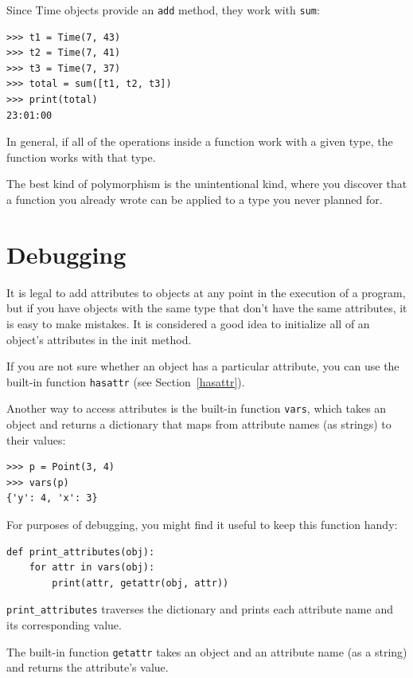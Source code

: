 \documentclass[10pt]{book}
\begin{document}
Since Time objects provide an {\tt add} method, they work
with {\tt sum}:

\begin{verbatim}
>>> t1 = Time(7, 43)
>>> t2 = Time(7, 41)
>>> t3 = Time(7, 37)
>>> total = sum([t1, t2, t3])
>>> print(total)
23:01:00
\end{verbatim}
%
In general, if all of the operations inside a function
work with a given type, the function works with that type.

The best kind of polymorphism is the unintentional kind, where
you discover that a function you already wrote can be
applied to a type you never planned for.


\section{Debugging}

It is legal to add attributes to objects at any point in the execution
of a program, but if you have objects with the same type that don't
have the same attributes, it is easy to make mistakes.
It is considered a good idea to
initialize all of an object's attributes in the init method.

If you are not sure whether an object has a particular attribute, you
can use the built-in function {\tt hasattr} (see Section~\ref{hasattr}).

Another way to access attributes is the built-in function {\tt vars},
which takes an object and returns a dictionary that maps from
attribute names (as strings) to their values:

\begin{verbatim}
>>> p = Point(3, 4)
>>> vars(p)
{'y': 4, 'x': 3}
\end{verbatim}
%
For purposes of debugging, you might find it useful to keep this
function handy:

\begin{verbatim}
def print_attributes(obj):
    for attr in vars(obj):
        print(attr, getattr(obj, attr))
\end{verbatim}
%
\verb"print_attributes" traverses the dictionary
and prints each attribute name and its corresponding value.

The built-in function {\tt getattr} takes an object and an attribute
name (as a string) and returns the attribute's value.
\end{document}
